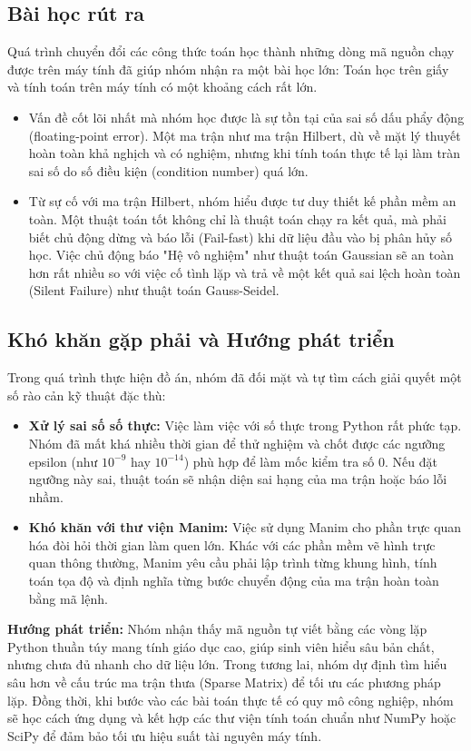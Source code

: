 \documentclass[12pt,a4paper]{article}
\begin{document}
\subsection{Bài học rút ra}
Quá trình chuyển đổi các công thức toán học thành những dòng mã nguồn chạy được trên máy tính đã giúp nhóm nhận ra một bài học lớn: Toán học trên giấy và tính toán trên máy tính có một khoảng cách rất lớn.
\begin{itemize}
    \item Vấn đề cốt lõi nhất mà nhóm học được là sự tồn tại của sai số dấu phẩy động (floating-point error). Một ma trận như ma trận Hilbert, dù về mặt lý thuyết hoàn toàn khả nghịch và có nghiệm, nhưng khi tính toán thực tế lại làm tràn sai số do số điều kiện (condition number) quá lớn.
    \item Từ sự cố với ma trận Hilbert, nhóm hiểu được tư duy thiết kế phần mềm an toàn. Một thuật toán tốt không chỉ là thuật toán chạy ra kết quả, mà phải biết chủ động dừng và báo lỗi (Fail-fast) khi dữ liệu đầu vào bị phân hủy số học. Việc chủ động báo "Hệ vô nghiệm" như thuật toán Gaussian sẽ an toàn hơn rất nhiều so với việc cố tình lặp và trả về một kết quả sai lệch hoàn toàn (Silent Failure) như thuật toán Gauss-Seidel.
\end{itemize}

\subsection{Khó khăn gặp phải và Hướng phát triển}
Trong quá trình thực hiện đồ án, nhóm đã đối mặt và tự tìm cách giải quyết một số rào cản kỹ thuật đặc thù:
\begin{itemize}
    \item \textbf{Xử lý sai số số thực:} Việc làm việc với số thực trong Python rất phức tạp. Nhóm đã mất khá nhiều thời gian để thử nghiệm và chốt được các ngưỡng epsilon (như $10^{-9}$ hay $10^{-14}$) phù hợp để làm mốc kiểm tra số 0. Nếu đặt ngưỡng này sai, thuật toán sẽ nhận diện sai hạng của ma trận hoặc báo lỗi nhầm.
    \item \textbf{Khó khăn với thư viện Manim:} Việc sử dụng Manim cho phần trực quan hóa đòi hỏi thời gian làm quen lớn. Khác với các phần mềm vẽ hình trực quan thông thường, Manim yêu cầu phải lập trình từng khung hình, tính toán tọa độ và định nghĩa từng bước chuyển động của ma trận hoàn toàn bằng mã lệnh.
\end{itemize}

\textbf{Hướng phát triển:} Nhóm nhận thấy mã nguồn tự viết bằng các vòng lặp Python thuần túy mang tính giáo dục cao, giúp sinh viên hiểu sâu bản chất, nhưng chưa đủ nhanh cho dữ liệu lớn. Trong tương lai, nhóm dự định tìm hiểu sâu hơn về cấu trúc ma trận thưa (Sparse Matrix) để tối ưu các phương pháp lặp. Đồng thời, khi bước vào các bài toán thực tế có quy mô công nghiệp, nhóm sẽ học cách ứng dụng và kết hợp các thư viện tính toán chuẩn như NumPy hoặc SciPy để đảm bảo tối ưu hiệu suất tài nguyên máy tính.
\end{document}
